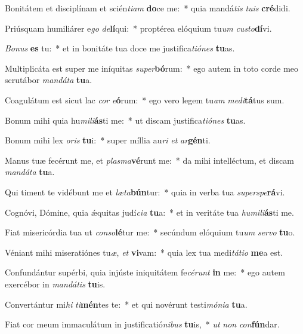 \item Bonitátem et disciplínam et scién\textit{ti}\textit{am} \textbf{do}ce me:~* quia mandá\textit{tis} \textit{tu}\textit{is} \textbf{cré}didi.
\item Priúsquam humiliárer e\textit{go} \textit{de}\textbf{lí}qui:~* proptérea elóquium tu\textit{um} \textit{cus}\textit{to}\textbf{dí}vi.
\item \textit{Bo}\textit{nus} \textbf{es} tu:~* et in bonitáte tua doce me justifica\textit{ti}\textit{ó}\textit{nes} \textbf{tu}as.
\item Multiplicáta est super me iníquitas \textit{su}\textit{per}\textbf{bó}rum:~* ego autem in toto corde meo scrutábor \textit{man}\textit{dá}\textit{ta} \textbf{tu}a.
\item Coagulátum est sicut lac \textit{cor} \textit{e}\textbf{ó}rum:~* ego vero legem tu\textit{am} \textit{me}\textit{di}\textbf{tá}tus sum.
\item Bonum mihi quia hu\textit{mi}\textit{li}\textbf{ás}ti me:~* ut discam justifica\textit{ti}\textit{ó}\textit{nes} \textbf{tu}as.
\item Bonum mihi lex \textit{o}\textit{ris} \textbf{tu}i:~* super míllia au\textit{ri} \textit{et} \textit{ar}\textbf{gén}ti.
\item Manus tuæ fecérunt me, et \textit{plas}\textit{ma}\textbf{vé}runt me:~* da mihi intelléctum, et discam \textit{man}\textit{dá}\textit{ta} \textbf{tu}a.
\item Qui timent te vidébunt me et \textit{læ}\textit{ta}\textbf{bún}tur:~* quia in verba tua \textit{su}\textit{per}\textit{spe}\textbf{rá}vi.
\item Cognóvi, Dómine, quia ǽquitas judí\textit{ci}\textit{a} \textbf{tu}a:~* et in veritáte tua \textit{hu}\textit{mi}\textit{li}\textbf{ás}ti me.
\item Fiat misericórdia tua ut \textit{con}\textit{so}\textbf{lé}tur me:~* secúndum elóquium tu\textit{um} \textit{ser}\textit{vo} \textbf{tu}o.
\item Véniant mihi miseratiónes tu\textit{æ}, \textit{et} \textbf{vi}vam:~* quia lex tua medi\textit{tá}\textit{ti}\textit{o} \textbf{me}a est.
\item Confundántur supérbi, quia injúste iniquitátem fe\textit{cé}\textit{runt} \textbf{in} me:~* ego autem exercébor in \textit{man}\textit{dá}\textit{tis} \textbf{tu}is.
\item Convertántur mi\textit{hi} \textit{ti}\textbf{mén}tes te:~* et qui novérunt testi\textit{mó}\textit{ni}\textit{a} \textbf{tu}a.
\item Fiat cor meum immaculátum in justificatió\textit{ni}\textit{bus} \textbf{tu}is,~* \textit{ut} \textit{non} \textit{con}\textbf{fún}dar.
